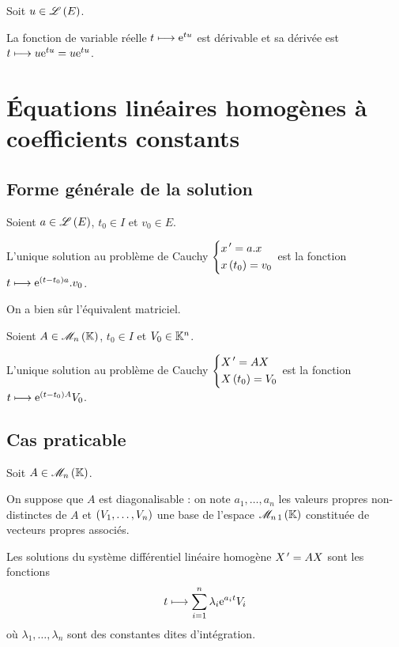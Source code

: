 \begin{prop}
Soit \(u\in\mathscr{L}\left(E\right)\).

La fonction de variable réelle \(t\longmapsto\mathrm{e}^{tu}\) est dérivable et sa dérivée est \(t\longmapsto u\mathrm{e}^{tu}=u\mathrm{e}^{tu}\).
\end{prop}

\section{Équations linéaires homogènes à coefficients constants}

\subsection{Forme générale de la solution}

\begin{prop}
Soient \(a\in\mathscr{L}\left(E\right)\), \(t_0\in I\) et \(v_0\in E\).

L'unique solution au problème de Cauchy \(\begin{dcases}
x^{\,\prime}=a.x \\
x\left(t_0\right)=v_0
\end{dcases}\) est la fonction \(t\longmapsto\mathrm{e}^{\left(t-t_0\right)a}.v_0\).
\end{prop}

On a bien sûr l'équivalent matriciel.

\begin{prop}
Soient \(A\in\M{n}\), \(t_0\in I\) et \(V_0\in\mathbb{K}^n\).

L'unique solution au problème de Cauchy \(\begin{dcases}
X^{\,\prime}=AX \\
X\left(t_0\right)=V_0
\end{dcases}\) est la fonction \(t\longmapsto\mathrm{e}^{\left(t-t_0\right)A}V_0\).
\end{prop}

\subsection{Cas praticable}

\begin{prop}
Soit \(A\in\M{n}\).

On suppose que \(A\) est diagonalisable : on note \(a_1,\dots,a_n\) les valeurs propres non-distinctes de \(A\) et \(\left(V_1,\dots,V_n\right)\) une base de l'espace \(\M{n\,1}\) constituée de vecteurs propres associés.

Les solutions du système différentiel linéaire homogène \(X^{\,\prime}=AX\) sont les fonctions \[t\longmapsto\sum_{i=1}^n\lambda_i\mathrm{e}^{a_it}V_i\] où \(\lambda_1,\dots,\lambda_n\) sont des constantes dites d'intégration.
\end{prop}

